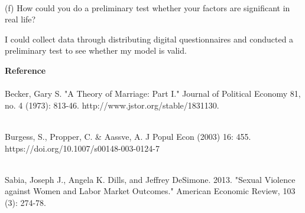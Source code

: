 \documentclass[letterpaper,12pt]{article}
\theoremstyle{definition}
\begin{document}
\textbf \\
{(f)} How could you do a preliminary test whether your factors are significant in real life?

I could collect data through distributing digital questionnaires and conducted a preliminary test to see whether my model is valid.

\vspace{5mm}

\noindent\textbf{Reference}\\
\textbf\\
Becker, Gary S. "A Theory of Marriage: Part I." Journal of Political Economy 81, no. 4 (1973): 813-46. http://www.jstor.org/stable/1831130.

\textbf\\
Burgess, S., Propper, C. & Aassve, A. J Popul Econ (2003) 16: 455. https://doi.org/10.1007/s00148-003-0124-7

\textbf\\
Sabia, Joseph J., Angela K. Dills, and Jeffrey DeSimone. 2013. "Sexual Violence against Women and Labor Market Outcomes." American Economic Review, 103 (3): 274-78.
\end{document}
